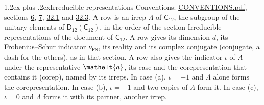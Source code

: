 \documentclass[10pt,a4paper]{article}
\makeatletter
\renewcommand\section{\@startsection{section}{1}{\z@}{-3ex plus -1ex minus -.2ex}%
  {1.2ex plus .2ex}{\normalfont\large\sffamily\bfseries\color{parttitle}}}
\numberwithin{equation}{section}
\newcommand{\eltfont}[1]{{\let\sigma\eltsigma\mathelt{#1}}}
\newcommand{\grp}[1]{\mathsf{#1}}
\newcommand{\elt}[1]{\eltfont{#1}}
\newcommand{\fsind}{\nu_{\mathrm{FS}}}
\makeatother
\begin{document}
\section{Irreducible representations}\label{s:irreps}
Conventions: \href{../../CONVENTIONS.pdf}{CONVENTIONS.pdf}, sections \href{../../../rotation/CONVENTIONS.pdf\#conv.6}{6}, \href{../../../rotation/CONVENTIONS.pdf\#conv.7}{7}, \href{../../CONVENTIONS.pdf\#conv.32.1}{32.1} and \href{../../CONVENTIONS.pdf\#conv.32.3}{32.3}.
\leavevmode\label{n:irrep.Delta}A row is an irrep $\Lambda$ of $\grp{C_{12}}$, the subgroup of the unitary elements of $\grp{D_{12}}(\grp{C_{12}})$, in the order of the section Irreducible representations of the document of \href{../../../rotation/data/pdf/C12.pdf}{$\grp{C_{12}}$}. \label{n:index.dimension}\label{n:index.frobenius}\label{n:head.irrep}\label{n:head.reality}\label{n:head.conjugate}A row gives its dimension $d$, its Frobenius--Schur indicator $\fsind$, its reality and its complex conjugate (conjugate, a dash for the others), as in that section. \label{n:head.case.corep}\label{n:head.corep}A row also gives the indicator $\iota$ of $\Lambda$ under the representative $\elt{a}$, its case and the corepresentation that contains it (corep), named by its irreps. In case (a), $\iota = +1$ and $\Lambda$ alone forms the corepresentation. In case (b), $\iota = -1$ and two copies of $\Lambda$ form it. In case (c), $\iota = 0$ and $\Lambda$ forms it with its partner, another irrep.
\setlength{\emergencystretch}{2em}\par\setlength{\emergencystretch}{0pt}
\end{document}
